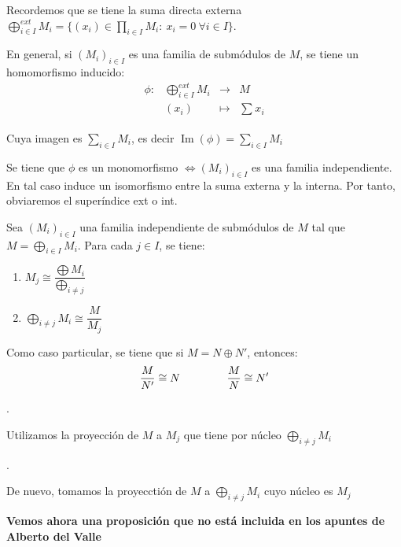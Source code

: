 \documentclass[openany]{book}
\begin{document}
Recordemos que se tiene la suma directa externa $ \bigoplus\limits_{i \in I}^{ext} M_i = \{ (x_i) \in \prod_{i \in I}^{}M_i :\ x_i = 0\ \forall i \in I  \}$.

En general, si $ (M_i)_{i \in I}$ es una familia de submódulos de $ M$, se tiene un homomorfismo inducido:
$$ 
\begin{aligned}
    \phi: & \bigoplus\limits_{i \in I}^{ext}M_i &  \to &  M\\ 
    & (x_i) & \mapsto & \sum\limits_{}^{}x_i
\end{aligned}
$$

Cuya imagen es $ \sum\limits_{i \in I}^{}M_i$, es decir $ \operatorname{Im}(\phi) = \sum\limits_{i \in I}^{}M_i$

Se tiene que $ \phi$ es un monomorfismo $ \iff (M_i)_{i \in I}$ es una familia independiente. En tal caso induce un isomorfismo entre la suma externa y la interna. Por tanto, obviaremos el superíndice ext o int. 

\setcounter{propositiont}{11}

\begin{proposition}
    Sea $ (M_i)_{i \in I}$ una familia independiente de submódulos de $ M$ tal que $ M = \bigoplus\limits_{i \in I}M_i$. Para cada $ j \in I$, se tiene:
    \begin{enumerate}
        \item $ M_j \cong \dfrac{\bigoplus M_i}{\bigoplus\limits_{i \ne j}}$
        \item $ \bigoplus\limits_{i \ne j} M_i \cong \dfrac{M}{M_j}$
    \end{enumerate}

    Como caso particular, se tiene que si $ M = N \oplus N'$, entonces:
    $$ \dfrac{M}{N'} \cong N \hspace{15mm} \dfrac{M}{N} \cong N' $$
\end{proposition}

\begin{demonstration}
    
    .
    
    Utilizamos la proyección de $ M$ a $ M_j$ que tiene por núcleo $ \bigoplus\limits_{i \ne j}M_i$

    .

    De nuevo, tomamos la proyecctión de $ M $ a $ \bigoplus\limits_{i \ne j} M_i$ cuyo núcleo es $ M_j$
\end{demonstration}

\noindent\textbf{Vemos ahora una proposición que no está incluida en los apuntes de Alberto del Valle}
\end{document}
